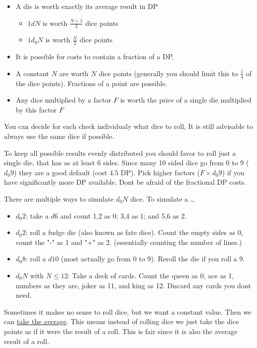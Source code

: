 \documentclass[11pt]{article}
\begin{document}
{\begin{short}
\begin{itemize}
\item A die is worth exactly its average result in DP
\begin{itemize}
\item \(1 d N\) is worth \(\frac{N+1}{2}\) dice points
\item \(1 d_0 N\) is worth \(\frac{N}{2}\) dice points
\end{itemize}
\item It is possible for costs to contain a fraction of a DP.
\item A constant \(N\) are worth \(N\) dice points (generally you should limit this to \(\frac{1}{4}\) of the dice points). Fractions of a point are possible.
\item Any dice multiplied by a factor \(F\) is worth the price of a single die multiplied by this factor \(F\)
\end{itemize}

You can decide for each check individualy what dice to roll, It is still advisable to always use the same dice if possible. 
\end{short}

To keep all possible results evenly distributed you should favor to roll just a single die, that has as at least 6 sides. Since many 10 sided dice go from 0 to 9 (\(d_0 9\)) they are a good default (cost \(4.5\) DP). Pick higher factors (\(F \times d_0 9\)) if you have significantly more DP available. Dont be afraid of the fractional DP costs. 

There are multiple ways to simulate \(d_0 N\) dice. To simulate a \ldots{}
\begin{itemize}
\item \(d_0 2\): take a \(d6\) and count 1,2 as 0; 3,4 as 1; and 5,6 as 2.
\item \(d_0 2\): roll a fudge die (also known as fate dice). Count the empty sides as 0, count the "-" as 1 and "+" as 2. (essentially counting the number of lines.)
\item \(d_0 8\): roll a \(d10\) (most actually go from 0 to 9). Reroll the die if you roll a 9.
\item \(d_0 N\) with \(N \le 12\): Take a deck of cards. Count the queen as 0, ace as 1, numbers as they are, joker as 11, and king as 12. Discard any cards you dont need.
\end{itemize}

Sometimes it makes no sense to roll dice, but we want a constant value. Then we can \hyperref[sec:orgd949dcb]{take the average}. This means instead of rolling dice we just take the dice points as if it were the result of a roll. This is fair since it is also the average result of a roll.

}
\end{document}
